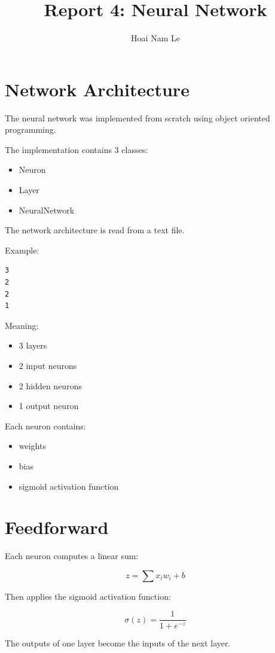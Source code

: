 \documentclass{article}
\title{Report 4: Neural Network}
\author{Hoai Nam Le}
\begin{document}
\maketitle

\section{Network Architecture}

The neural network was implemented from scratch
using object oriented programming.

The implementation contains 3 classes:

\begin{itemize}
    \item Neuron
    \item Layer
    \item NeuralNetwork
\end{itemize}

The network architecture is read from a text file.

Example:

\begin{verbatim}
3
2
2
1
\end{verbatim}

Meaning:
\begin{itemize}
    \item 3 layers
    \item 2 input neurons
    \item 2 hidden neurons
    \item 1 output neuron
\end{itemize}

Each neuron contains:
\begin{itemize}
    \item weights
    \item bias
    \item sigmoid activation function
\end{itemize}

\section{Feedforward}

Each neuron computes a linear sum:

\[
z = \sum x_iw_i + b
\]

Then applies the sigmoid activation function:

\[
\sigma(z) = \frac{1}{1 + e^{-z}}
\]

The outputs of one layer become the inputs
of the next layer.
\end{document}
